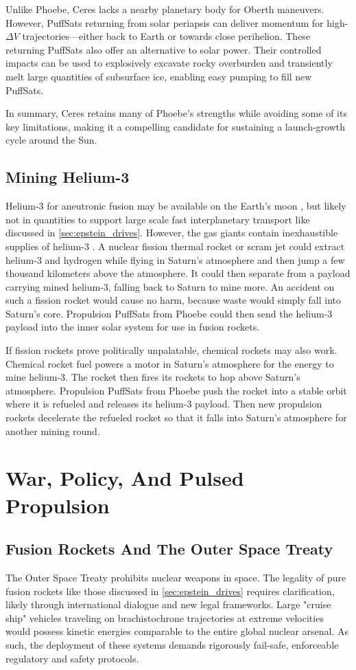 \documentclass{article}
\begin{document}
Unlike Phoebe, Ceres lacks a nearby planetary body for Oberth maneuvers. However, PuffSats returning from solar periapsis can deliver momentum for high-$\Delta V$ trajectories—either back to Earth or towards close perihelion. These returning PuffSats also offer an alternative to solar power. Their controlled impacts can be used to explosively excavate rocky overburden and transiently melt large quantities of subsurface ice, enabling easy pumping to fill new PuffSats.

In summary, Ceres retains many of Phoebe’s strengths while avoiding some of its key limitations, making it a compelling candidate for sustaining a launch-growth cycle around the Sun.

\subsection{Mining Helium-3} \label{sec:mining_helium_3}
Helium-3 for aneutronic fusion may be available on the Earth's moon \cite{esa_helium3_mining}, but likely not in quantities to support large scale fast interplanetary transport like discussed in \autoref{sec:epstein_drives}.   However, the gas giants contain inexhaustible supplies of helium-3 \cite{palaszewski2005atmospheric}.   A nuclear fission thermal rocket or scram jet could extract helium-3 and hydrogen while flying in Saturn's atmosphere and then jump a few thousand kilometers above the atmosphere.  It could then separate from a payload carrying mined helium-3, falling back to Saturn to mine more.  An accident on such a fission rocket would cause no harm, because waste would simply fall into Saturn's core. Propulsion PuffSats from Phoebe could then send the helium-3 payload into the inner solar system for use in fusion rockets.  

If fission rockets prove politically unpalatable, chemical rockets may also work.   Chemical rocket fuel powers a motor in Saturn's atmosphere for the energy to mine helium-3.  The rocket then fires its rockets to hop above Saturn's atmosphere.   Propulsion PuffSats from Phoebe push the rocket into a stable orbit where it is refueled and releases its helium-3 payload.  Then new propulsion rockets decelerate the refueled rocket so that it falls into Saturn's atmosphere for another mining round.


\section{War, Policy, And Pulsed Propulsion}
\subsection{Fusion Rockets And The Outer Space Treaty}
The Outer Space Treaty \cite{outer_space_treaty} prohibits nuclear weapons in space. The legality of pure fusion rockets like those discussed in \autoref{sec:epstein_drives} requires clarification, likely through international dialogue and new legal frameworks.  Large "cruise ship" vehicles traveling on brachistochrone trajectories at extreme velocities would possess kinetic energies comparable to the entire global nuclear arsenal. As such, the deployment of these systems demands rigorously fail-safe, enforceable regulatory and safety protocols.
\end{document}
